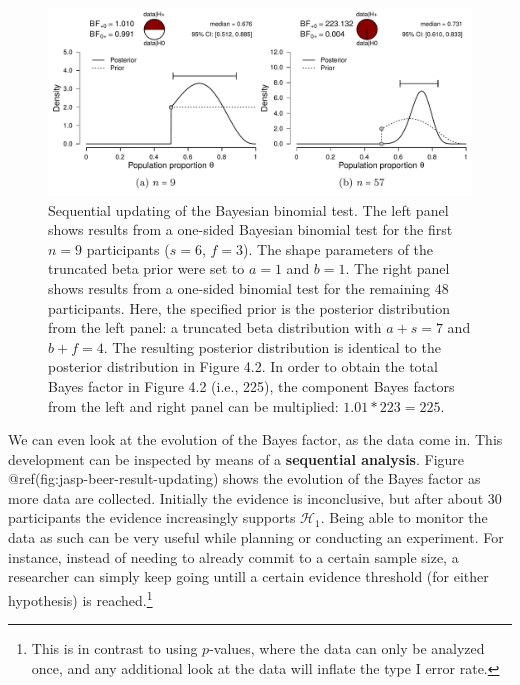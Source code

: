 \documentclass[
  letterpaper,
  DIV=11,
  numbers=noendperiod]{scrreprt}
\begin{document}
\begin{figure}

{\centering \includegraphics[width=1\textwidth,height=\textheight]{Figures/BeerUpdatingPosteriorPlot.png}

}

\caption{Sequential updating of the Bayesian binomial test. The left
panel shows results from a one-sided Bayesian binomial test for the
first \(n = 9\) participants (\(s = 6\), \(f = 3\)). The shape
parameters of the truncated beta prior were set to \(a = 1\) and
\(b = 1\). The right panel shows results from a one-sided binomial test
for the remaining \(48\) participants. Here, the specified prior is the
posterior distribution from the left panel: a truncated beta
distribution with \(a+s = 7\) and \(b+f = 4\). The resulting posterior
distribution is identical to the posterior distribution in Figure 4.2.
In order to obtain the total Bayes factor in Figure 4.2 (i.e., 225), the
component Bayes factors from the left and right panel can be multiplied:
\(1.01 * 223 = 225\).}

\end{figure}

We can even look at the evolution of the Bayes factor, as the data come
in. This development can be inspected by means of a \textbf{sequential
analysis}. Figure @ref(fig:jasp-beer-result-updating) shows the
evolution of the Bayes factor as more data are collected. Initially the
evidence is inconclusive, but after about \(30\) participants the
evidence increasingly supports \(\mathcal{H}_1\). Being able to monitor
the data as such can be very useful while planning or conducting an
experiment. For instance, instead of needing to already commit to a
certain sample size, a researcher can simply keep going untill a certain
evidence threshold (for either hypothesis) is reached.\footnote{This is
  in contrast to using \(p\)-values, where the data can only be analyzed
  once, and any additional look at the data will inflate the type I
  error rate.}
\end{document}
